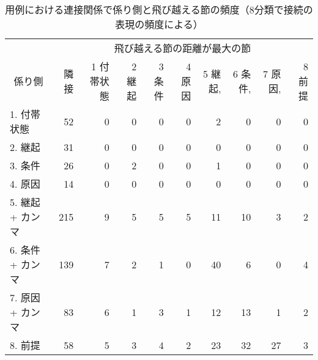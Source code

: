 \begin{table*}
\caption{用例における連接関係で係り側と飛び越える節の頻度（8分類で接続の表現の頻度による）}
\label{table:freq8cj}
\begin{tabular}{|l|r|r|r|r|r|r|r|r|r|}
\hline
\multicolumn{1}{|p{10zw}|}{} & \multicolumn{9}{|c|}{飛び越える節の距離が最大の節}\\
\cline{2-10}
\multicolumn{1}{|c|}{係り側} & \multicolumn{1}{|p{2zw}|}{隣接} & \multicolumn{1}{|p{2zw}|}{1 付帯状態} & \multicolumn{1}{|p{2zw}|}{2 継起} & \multicolumn{1}{|p{2zw}|}{3 条件} & \multicolumn{1}{|p{2zw}|}{4 原因} & \multicolumn{1}{|p{2zw}|}{5 継起,} & \multicolumn{1}{|p{2zw}|}{6 条件,} & \multicolumn{1}{|p{2zw}|}{7 原因,} & \multicolumn{1}{|p{2zw}|}{8 前提}\\
\hline
1. 付帯状態 & 52 & 0 & 0 & 0 & 0 & 2 & 0 & 0 & 0 \\
\cline{3-3}
2. 継起 & 31 & 0 & 0 & 0 & 0 & 0 & 0 & 0 & 0 \\
\cline{4-4}
3. 条件 & 26 & 0 & 2 & 0 & 0 & 1 & 0 & 0 & 0 \\
\cline{5-5}
4. 原因 & 14 & 0 & 0 & 0 & 0 & 0 & 0 & 0 & 0 \\
\cline{6-6}
5. 継起 + カンマ & 215 & 9 & 5 & 5 & 5 & 11 & 10 & 3 & 2 \\
\cline{7-7}
6. 条件 + カンマ & 139 & 7 & 2 & 1 & 0 & 40 & 6 & 0 & 4 \\
\cline{8-8}
7. 原因 + カンマ & 83 & 6 & 1 & 3 & 1 & 12 & 13 & 1 & 2 \\
\cline{9-9}
8. 前提 & 58 & 5 & 3 & 4 & 2 & 23 & 32 & 27 & 3 \\
\hline
\end{tabular}
\end{table*}

